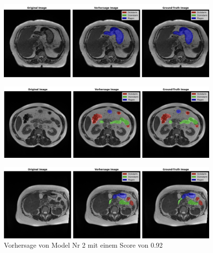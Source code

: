 \begin{figure}[H]
	\begin{center}
		\includegraphics[width=400pt]{LaTex/bilder/case36_day10_slice_0060.png}
		\caption{  }\label{Fig:case36_day10_slice_0060}
	\end{center}
\end{figure}


\begin{figure}[H]
	\begin{center}
		\includegraphics[width=400pt]{LaTex/bilder/case156_day11_slice_0110.png}
		\caption{  }\label{Fig:case123_day20_slice_0073}
	\end{center}
\end{figure}

\begin{figure}[H]
	\begin{center}
		\includegraphics[width=400pt]{LaTex/bilder/case41_day32_slice_0106.png}
		\caption{ Vorhersage von Model Nr 2 mit einem Score von 0.92 }\label{Fig:case41_day32_slice_0106}
	\end{center}
\end{figure}


